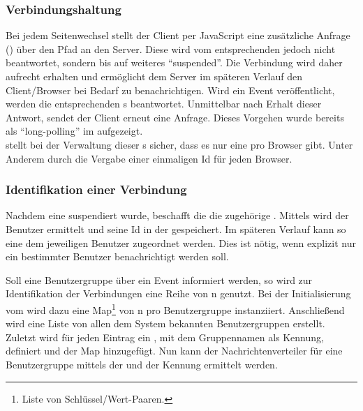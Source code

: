 \subsubsection{Verbindungshaltung}
\label{subsub:Verbindungshaltung}
Bei jedem Seitenwechsel stellt der Client per JavaScript eine zusätzliche Anfrage () über den
 Pfad an den Server. Diese  wird vom entsprechenden  jedoch nicht
beantwortet, sondern bis auf weiteres "`suspended"'. Die Verbindung wird daher aufrecht erhalten und ermöglicht dem Server im
späteren Verlauf den Client/Browser bei Bedarf zu benachrichtigen. Wird ein Event veröffentlicht, werden die entsprechenden
s beantwortet. Unmittelbar nach Erhalt dieser Antwort, sendet der Client erneut eine Anfrage. Dieses
Vorgehen wurde bereits als "`long-polling"' im  aufgezeigt.\\
 stellt bei der Verwaltung dieser s sicher, dass es nur eine 
pro Browser gibt. Unter Anderem durch die Vergabe einer einmaligen Id für jeden Browser.

\subsubsection{Identifikation einer Verbindung}
\label{subsub:Identifikation einer Verbindung}
Nachdem eine  suspendiert wurde, beschafft die  die zugehörige
. Mittels  wird der Benutzer ermittelt und seine Id in der 
gespeichert. Im späteren Verlauf kann so eine  dem jeweiligen Benutzer zugeordnet werden. Dies ist nötig,
wenn \zB explizit nur ein bestimmter Benutzer benachrichtigt werden soll.

Soll eine Benutzergruppe über ein Event informiert werden, so wird zur Identifikation der Verbindungen eine Reihe von 
n genutzt. Bei der Initialisierung vom  wird dazu eine
Map\footnote{Liste von Schlüssel/Wert-Paaren.} von n pro Benutzergruppe instanziiert. Anschließend wird
eine Liste von allen dem System bekannten Benutzergruppen erstellt. Zuletzt wird für jeden Eintrag ein ,
mit dem Gruppennamen als Kennung, definiert und der Map  hinzugefügt. Nun kann der
Nachrichtenverteiler für eine Benutzergruppe mittels der  und der Kennung ermittelt werden.

